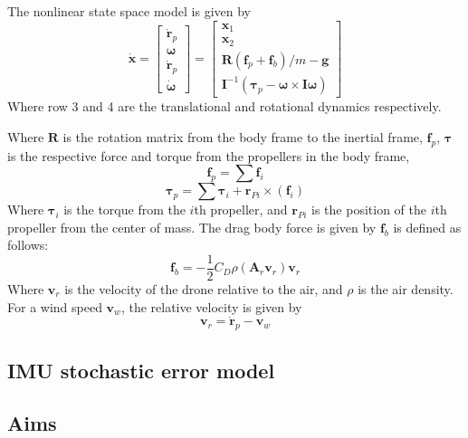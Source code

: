 \documentclass{article}
\begin{document}
The nonlinear state space model is given by
\begin{equation}
    \mathbf{\dot{x}} = \begin{bmatrix}
        \mathbf{\dot{r}}_p \\
        \boldsymbol{\omega} \\
        \mathbf{\dot{r}}_p \\
        \boldsymbol{\dot{\omega}}
    \end{bmatrix} = \begin{bmatrix}
        \mathbf{x}_1 \\
        \mathbf{x}_2 \\
        \mathbf{R}(\mathbf{f}_p + \mathbf{f}_b) / m - \mathbf{g} \\
        \mathbf{I}^{-1} (\boldsymbol{\tau}_p - \boldsymbol{\omega} \times \mathbf{I} \boldsymbol{\omega})
    \end{bmatrix}
\end{equation}
Where row 3 and 4 are the translational and rotational dynamics respectively.

Where $\mathbf{R}$ is the rotation matrix from the body frame to the inertial frame,
$\mathbf{f}_p$, $\boldsymbol{\tau}$ is the respective force and torque from the propellers in the body frame,
\begin{equation}
    \mathbf{f}_p = \sum{\mathbf{f}_i}
\end{equation}
\begin{equation}
    \boldsymbol{\tau}_p = \sum{\boldsymbol{\tau}_i + \mathbf{r}_{Pi} \times (\mathbf{f}_i)}
\end{equation}
Where $\boldsymbol{\tau}_i$ is the torque from the $i$th propeller, and $\mathbf{r}_{Pi}$ is the position of the $i$th propeller from the center of mass.
The drag body force is given by $\mathbf{f}_b$ is defined as follows:
\begin{equation}
    \mathbf{f}_b = -\frac{1}{2} C_D \rho (\mathbf{A}_r \mathbf{v}_r ) \mathbf{v}_r
\end{equation}
Where $\mathbf{v}_r$ is the velocity of the drone relative to the air, and $\rho$ is the air density.
For a wind speed $\mathbf{v}_w$, the relative velocity is given by
\begin{equation}
    \mathbf{v}_r = \mathbf{\dot{r}}_p - \mathbf{v}_w
\end{equation}

\subsection{IMU stochastic error model}

\subsection{Aims}
\end{document}
